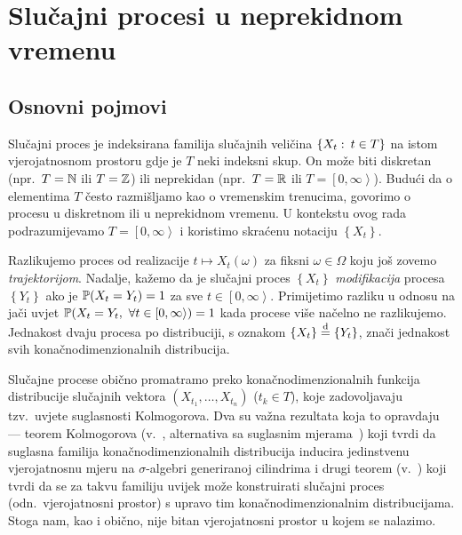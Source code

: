 \documentclass[main.tex]{subfiles}
\begin{document}
\nocite{*}

\chapter{Slučajni procesi u neprekidnom vremenu} \label{ch:sp}
\section{Osnovni pojmovi} \label{sec:sp-osnovni}
Slučajni proces je indeksirana familija slučajnih veličina \( \left\{ X_t \st t \in T \right\} \) na istom vjerojatnosnom prostoru
gdje je \( T \) neki indeksni skup. On može biti diskretan (npr.\ \( T = \N \) ili \( T = \Z \))
ili neprekidan (npr.\ \( T = \R \) ili \( T = \left[ 0, \infty \right\rangle  \)). Budući da o
elementima \( T \) često razmišljamo kao o vremenskim trenucima, govorimo o procesu u diskretnom
ili u neprekidnom vremenu.
U kontekstu ovog rada podrazumijevamo \( T = \left[ 0,\infty \right\rangle \) i koristimo skraćenu notaciju
\( \left\{ X_t \right\} \).

Razlikujemo proces od realizacije
\( t \mapsto X_t(\omega) \) za fiksni \( \omega \in \Omega \)
koju još zovemo \emph{trajektorijom}. Nadalje, kažemo da je slučajni proces \( \left\{ X_t \right\} \) \emph{modifikacija} procesa
\( \left\{ Y_t \right\} \) ako je \( \P(X_t = Y_t) = 1 \) za sve \( t \in \left[ 0,\infty \right\rangle \). Primijetimo razliku u odnosu
na jači uvjet \( \P(X_t = Y_t,\ \forall t \in \left[ 0,\infty \right\rangle) = 1 \) kada procese više načelno ne razlikujemo.
Jednakost dvaju procesa po distribuciji, s oznakom \( \{ X_t \} \jpod \{ Y_t \}\), znači jednakost svih konačnodimenzionalnih distribucija.

Slučajne procese obično promatramo preko konačnodimenzionalnih funkcija distribucije
slučajnih vektora \( (X_{t_1},\ldots,X_{t_n}) \) (\( t_k \in T \)), koje zadovoljavaju tzv.\ uvjete suglasnosti Kolmogorova.
Dva su važna rezultata koja to opravdaju --- teorem Kolmogorova (v.~\cite[tm.~9.6]{sarapa}, alternativa sa suglasnim mjerama~\cite[tm.~1.8]{sato}) koji tvrdi
da suglasna familija konačnodimenzionalnih distribucija inducira je\-din\-stve\-nu vjerojatnosnu mjeru na \( \sigma \)-algebri generiranoj cilindrima
i drugi teorem (v.~\cite[tm.~9.7]{sarapa}) koji tvrdi da se za takvu familiju uvijek može konstruirati
slučajni proces (odn.\ vjerojatnosni prostor) s upravo tim konačnodimenzionalnim distribucijama. Stoga nam, kao i obično,
nije bitan vjerojatnosni prostor u kojem se nalazimo.
\end{document}
